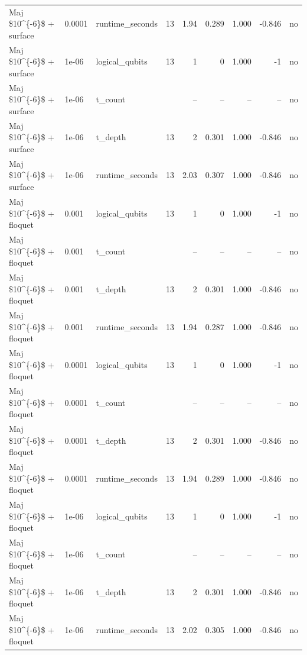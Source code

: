 \begin{tabular}{lllrrrrrl}
Maj \$10\textasciicircum{}\{-6\}\$ + surface & 0.0001 & runtime\_seconds & 13 & 1.94 & 0.289 & 1.000 & -0.846 & no \\
Maj \$10\textasciicircum{}\{-6\}\$ + surface & 1e-06 & logical\_qubits & 13 & 1 & 0 & 1.000 & -1 & no \\
Maj \$10\textasciicircum{}\{-6\}\$ + surface & 1e-06 & t\_count &  & -- & -- & -- & -- & no \\
Maj \$10\textasciicircum{}\{-6\}\$ + surface & 1e-06 & t\_depth & 13 & 2 & 0.301 & 1.000 & -0.846 & no \\
Maj \$10\textasciicircum{}\{-6\}\$ + surface & 1e-06 & runtime\_seconds & 13 & 2.03 & 0.307 & 1.000 & -0.846 & no \\
Maj \$10\textasciicircum{}\{-6\}\$ + floquet & 0.001 & logical\_qubits & 13 & 1 & 0 & 1.000 & -1 & no \\
Maj \$10\textasciicircum{}\{-6\}\$ + floquet & 0.001 & t\_count &  & -- & -- & -- & -- & no \\
Maj \$10\textasciicircum{}\{-6\}\$ + floquet & 0.001 & t\_depth & 13 & 2 & 0.301 & 1.000 & -0.846 & no \\
Maj \$10\textasciicircum{}\{-6\}\$ + floquet & 0.001 & runtime\_seconds & 13 & 1.94 & 0.287 & 1.000 & -0.846 & no \\
Maj \$10\textasciicircum{}\{-6\}\$ + floquet & 0.0001 & logical\_qubits & 13 & 1 & 0 & 1.000 & -1 & no \\
Maj \$10\textasciicircum{}\{-6\}\$ + floquet & 0.0001 & t\_count &  & -- & -- & -- & -- & no \\
Maj \$10\textasciicircum{}\{-6\}\$ + floquet & 0.0001 & t\_depth & 13 & 2 & 0.301 & 1.000 & -0.846 & no \\
Maj \$10\textasciicircum{}\{-6\}\$ + floquet & 0.0001 & runtime\_seconds & 13 & 1.94 & 0.289 & 1.000 & -0.846 & no \\
Maj \$10\textasciicircum{}\{-6\}\$ + floquet & 1e-06 & logical\_qubits & 13 & 1 & 0 & 1.000 & -1 & no \\
Maj \$10\textasciicircum{}\{-6\}\$ + floquet & 1e-06 & t\_count &  & -- & -- & -- & -- & no \\
Maj \$10\textasciicircum{}\{-6\}\$ + floquet & 1e-06 & t\_depth & 13 & 2 & 0.301 & 1.000 & -0.846 & no \\
Maj \$10\textasciicircum{}\{-6\}\$ + floquet & 1e-06 & runtime\_seconds & 13 & 2.02 & 0.305 & 1.000 & -0.846 & no \\
\bottomrule
\end{tabular}

